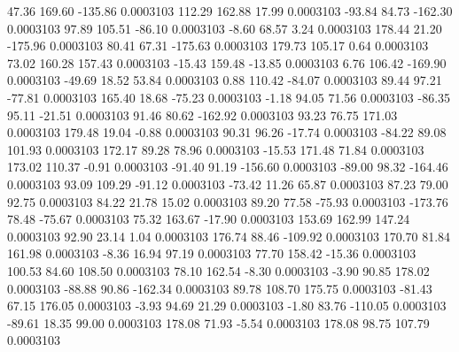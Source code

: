        47.36      169.60     -135.86     0.0003103
      112.29      162.88       17.99     0.0003103
      -93.84       84.73     -162.30     0.0003103
       97.89      105.51      -86.10     0.0003103
       -8.60       68.57        3.24     0.0003103
      178.44       21.20     -175.96     0.0003103
       80.41       67.31     -175.63     0.0003103
      179.73      105.17        0.64     0.0003103
       73.02      160.28      157.43     0.0003103
      -15.43      159.48      -13.85     0.0003103
        6.76      106.42     -169.90     0.0003103
      -49.69       18.52       53.84     0.0003103
        0.88      110.42      -84.07     0.0003103
       89.44       97.21      -77.81     0.0003103
      165.40       18.68      -75.23     0.0003103
       -1.18       94.05       71.56     0.0003103
      -86.35       95.11      -21.51     0.0003103
       91.46       80.62     -162.92     0.0003103
       93.23       76.75      171.03     0.0003103
      179.48       19.04       -0.88     0.0003103
       90.31       96.26      -17.74     0.0003103
      -84.22       89.08      101.93     0.0003103
      172.17       89.28       78.96     0.0003103
      -15.53      171.48       71.84     0.0003103
      173.02      110.37       -0.91     0.0003103
      -91.40       91.19     -156.60     0.0003103
      -89.00       98.32     -164.46     0.0003103
       93.09      109.29      -91.12     0.0003103
      -73.42       11.26       65.87     0.0003103
       87.23       79.00       92.75     0.0003103
       84.22       21.78       15.02     0.0003103
       89.20       77.58      -75.93     0.0003103
     -173.76       78.48      -75.67     0.0003103
       75.32      163.67      -17.90     0.0003103
      153.69      162.99      147.24     0.0003103
       92.90       23.14        1.04     0.0003103
      176.74       88.46     -109.92     0.0003103
      170.70       81.84      161.98     0.0003103
       -8.36       16.94       97.19     0.0003103
       77.70      158.42      -15.36     0.0003103
      100.53       84.60      108.50     0.0003103
       78.10      162.54       -8.30     0.0003103
       -3.90       90.85      178.02     0.0003103
      -88.88       90.86     -162.34     0.0003103
       89.78      108.70      175.75     0.0003103
      -81.43       67.15      176.05     0.0003103
       -3.93       94.69       21.29     0.0003103
       -1.80       83.76     -110.05     0.0003103
      -89.61       18.35       99.00     0.0003103
      178.08       71.93       -5.54     0.0003103
      178.08       98.75      107.79     0.0003103
